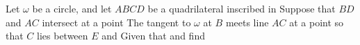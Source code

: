Let $\omega$ be a circle, and let $ABCD$ be a quadrilateral inscribed in   Suppose that $BD$ and $AC$ intersect at a point   The tangent to $\omega$ at $B$ meets line $AC$ at a point  so that $C$ lies between $E$ and   Given that    and  find 